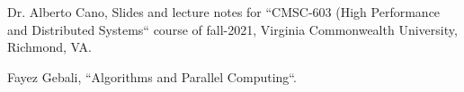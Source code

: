 \documentclass[conference]{IEEEtran}
\begin{document}
\begin{thebibliography}{00}
 Dr. Alberto Cano, Slides and lecture notes for ``CMSC-603 (High Performance and Distributed Systems`` course of fall-2021, Virginia Commonwealth University, Richmond, VA.

 Fayez Gebali, ``Algorithms and Parallel Computing``.
\end{thebibliography}
\vspace{12pt}
\end{document}
